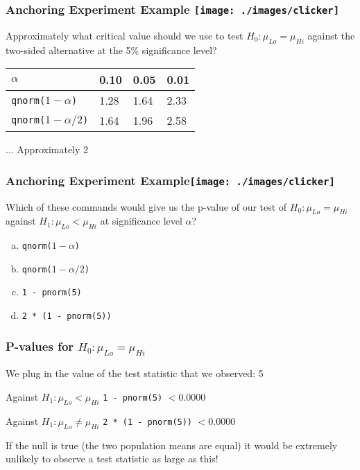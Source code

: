 \begin{frame}[t]
\frametitle{Anchoring Experiment Example \hfill \texttt{[image: ./images/clicker]}}
Approximately what critical value should we use to test $H_0\colon \mu_{Lo} = \mu_{Hi}$ against the two-sided alternative at the 5\% significance level?

\pause
\vspace{1em}
\begin{center}
\begin{tabular}{l|lll}
$\alpha$ &   0.10& 0.05 &0.01\\
\hline
\texttt{qnorm($1-\alpha$)} & 1.28 &1.64 &2.33\\
\texttt{qnorm($1-\alpha/2$)} &1.64 &\alert{1.96}& 2.58
\end{tabular}
\end{center}
\hfill \alert{... Approximately 2}
\end{frame}
\begin{frame}
\frametitle{Anchoring Experiment Example\hfill \texttt{[image: ./images/clicker]}}
Which of these commands would give us the p-value of our test of $H_0\colon \mu_{Lo} = \mu_{Hi}$ against $H_1\colon \mu_{Lo}<\mu_{Hi}$ at significance level $\alpha$?
\vspace{1em}
	\begin{enumerate}[(a)]
		\item \texttt{qnorm($1-\alpha$)}
		\item \texttt{qnorm($1-\alpha/2$)}
		\item \texttt{1 - pnorm(5)}
		\item \texttt{2 * (1 - pnorm(5))}
	\end{enumerate}
	

\end{frame}

\begin{frame}
\frametitle{P-values for $H_0\colon \mu_{Lo} = \mu_{Hi}$}
We plug in the value of the test statistic that we observed: 5
\begin{block}{Against $H_1\colon \mu_{Lo}< \mu_{Hi}$}
\texttt{1 - pnorm(5)} $< 0.0000$
\end{block}

\begin{block}{Against $H_1\colon \mu_{Lo}\neq \mu_{Hi}$}
\texttt{2 * (1 - pnorm(5))} $< 0.0000$
\end{block}

\vspace{1em}

\alert{If the null is true (the two population means are equal) it would be extremely unlikely to observe a test statistic as large as this!}

\vspace{1em} 
\hfill {}
\end{frame}


